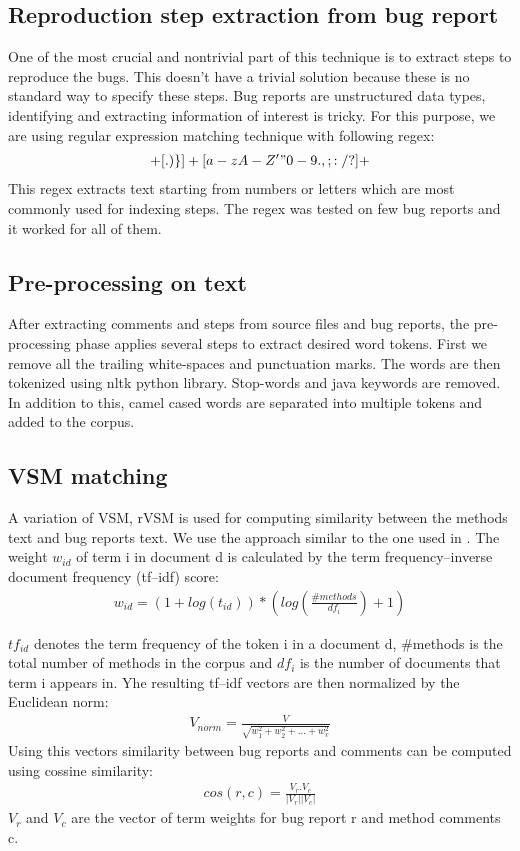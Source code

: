 \documentclass[sigconf]{acmart}
\begin{document}
\subsection*{Reproduction step extraction from bug report}
One of the most crucial and nontrivial part of this technique is to extract steps to reproduce the bugs. This doesn't have a trivial solution because these is no standard way to specify these steps. Bug reports are unstructured data types, identifying and extracting information of interest is tricky. For this purpose, we are using regular expression matching technique with following regex:
\begin{gather*}
[0-9]+[.)\} ]+[a-zA-Z '"0-9.,;:/?]+
\end{gather*}
This regex extracts text starting from numbers or letters which are most commonly used for indexing steps. The regex was tested on few bug reports and it worked for all of them.

\subsection*{Pre-processing on text}
After extracting comments and steps from source files and bug reports, the pre-processing phase applies several steps to extract desired word tokens. First we remove all the trailing white-spaces and punctuation marks. The words are then tokenized using nltk python library. Stop-words and java keywords are removed. In addition to this, camel cased words are separated into multiple tokens and added to the corpus.

\subsection{VSM matching}
A variation of VSM, rVSM\cite{rvsm} is used for computing similarity between the methods text and bug reports text. We use the approach similar to the one used in \cite{original}.  The weight $w_{id}$ of term i in document d is calculated by the term frequency–inverse document frequency (tf–idf) score:
\begin{gather*}
	w_{id}=(1+log(t_{id}))*(log(\frac{\#methods}{df_i})+1)
\end{gather*}

$tf_{id}$ denotes the term frequency of the token i in a document d, \#methods is the total number of methods in the corpus and $df_i$ is the number of documents that term i appears in. Yhe resulting tf–idf vectors are then normalized by the Euclidean norm:
\begin{gather*}
	V_{norm} = \frac{V}{\sqrt{w_1^2 + w_2^2 + ... + w_v^2}}
\end{gather*}
Using this vectors similarity between bug reports and comments can be computed using cossine similarity:
\begin{gather*}
cos(r,c)=\frac{V_r.V_c}{|V_r||V_c|}
\end{gather*}
$V_r$ and $V_c$ are the vector of term weights for bug report r and method comments c.
\end{document}

